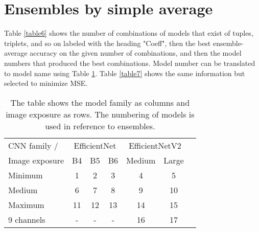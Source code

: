 \documentclass[10pt,letterpaper]{article}
\begin{document}
\pagebreak





\pagebreak

\section{Ensembles by simple average}
\centering

Table \ref{table6} shows the number of combinations of models that exist
of tuples, triplets, and so on labeled with the heading "Coeff", then
the best ensemble-average accuracy on the given number of combinations,
and then the model numbers that produced the best combinations. Model number can be
translated to model name using Table \ref{table1}. Table \ref{table7}
shows the same information but selected to minimize MSE. 

\begin{table}[hbt!]
\caption{The table shows the model family as columns and image exposure as rows. The numbering of models is used in reference to ensembles.}
\begin{tabular}{ |l|c|c|c|c|c|c| }
\hline
CNN family / & \multicolumn{3}{c|}{EfficientNet} & \multicolumn{2}{c|}{EfficientNetV2} \\
Image exposure & B4 & B5 & B6 &Medium &Large  \\ 
\hline
Minimum & 1 & 2 & 3 & 4 & 5  \\ 
Medium & 6 & 7 & 8 & 9 & 10  \\ 
Maximum & 11 & 12 & 13 & 14 & 15  \\ 
9 channels & - & - & - & 16 & 17  \\ 
\hline
\end{tabular}
\label{table1}
\end{table}
\end{document}
